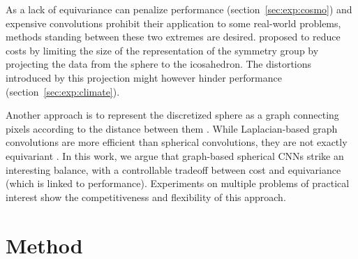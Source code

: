 \documentclass{article} %
\newcommand{\todo}[1]{{\color[rgb]{.6,.1,.6}{#1}}}
\newcommand{\secref}[1]{section~\ref{sec:#1}}
\begin{document}
As a lack of equivariance can penalize performance (\secref{exp:cosmo}) and expensive convolutions prohibit their application to some real-world problems, methods standing between these two extremes are desired.
\citet{cohen2019gauge} proposed to reduce costs by limiting the size of the representation of the symmetry group by projecting the data from the sphere to the icosahedron.
The distortions introduced by this projection might however hinder performance (\secref{exp:climate}).

Another approach is to represent the discretized sphere as a graph connecting pixels according to the distance between them \citep{bruna2013gnn, khasanova2017sphericalcnn, perraudin2019deepspherecosmo}.
While Laplacian-based graph convolutions are more efficient than spherical convolutions, they are not exactly equivariant \citep{defferrard2019deepsphereequiv}.
In this work, we argue that graph-based spherical CNNs strike an interesting balance, with a controllable tradeoff between cost and equivariance (which is linked to performance).
Experiments on multiple problems of practical interest show the competitiveness and flexibility of this approach.

\section{Method}

\end{document}
